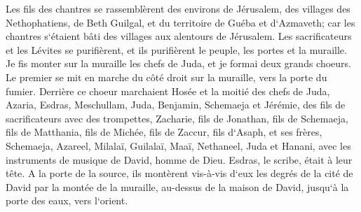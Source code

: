 \verse Les fils des chantres se rassemblèrent des environs de Jérusalem, des villages des Nethophatiens, 
\verse de Beth Guilgal, et du territoire de Guéba et d`Azmaveth; car les chantres s`étaient bâti des villages aux alentours de Jérusalem. 
\verse Les sacrificateurs et les Lévites se purifièrent, et ils purifièrent le peuple, les portes et la muraille. 
\verse Je fis monter sur la muraille les chefs de Juda, et je formai deux grands choeurs. Le premier se mit en marche du côté droit sur la muraille, vers la porte du fumier. 
\verse Derrière ce choeur marchaient Hosée et la moitié des chefs de Juda, 
\verse Azaria, Esdras, Meschullam, 
\verse Juda, Benjamin, Schemaeja et Jérémie, 
\verse des fils de sacrificateurs avec des trompettes, Zacharie, fils de Jonathan, fils de Schemaeja, fils de Matthania, fils de Michée, fils de Zaccur, fils d`Asaph, 
\verse et ses frères, Schemaeja, Azareel, Milalaï, Guilalaï, Maaï, Nethaneel, Juda et Hanani, avec les instruments de musique de David, homme de Dieu. Esdras, le scribe, était à leur tête. 
\verse A la porte de la source, ils montèrent vis-à-vis d`eux les degrés de la cité de David par la montée de la muraille, au-dessus de la maison de David, jusqu`à la porte des eaux, vers l`orient. 
